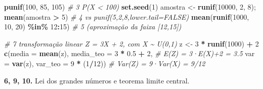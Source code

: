\documentclass[
  portuguese,
  11pt,
  openany]{book}
\newenvironment{Shaded}{\begin{snugshade}}{\end{snugshade}}
\newcommand{\AttributeTok}[1]{\textcolor[rgb]{0.13,0.29,0.53}{#1}}
\newcommand{\CommentTok}[1]{\textcolor[rgb]{0.56,0.35,0.01}{\textit{#1}}}
\newcommand{\DecValTok}[1]{\textcolor[rgb]{0.00,0.00,0.81}{#1}}
\newcommand{\FloatTok}[1]{\textcolor[rgb]{0.00,0.00,0.81}{#1}}
\newcommand{\FunctionTok}[1]{\textcolor[rgb]{0.13,0.29,0.53}{\textbf{#1}}}
\newcommand{\NormalTok}[1]{#1}
\newcommand{\OtherTok}[1]{\textcolor[rgb]{0.56,0.35,0.01}{#1}}
\newcommand{\SpecialCharTok}[1]{\textcolor[rgb]{0.81,0.36,0.00}{\textbf{#1}}}
\begin{document}
\begin{Shaded}
\begin{Highlighting}[]
\FunctionTok{punif}\NormalTok{(}\DecValTok{100}\NormalTok{, }\DecValTok{85}\NormalTok{, }\DecValTok{105}\NormalTok{)                              }\CommentTok{\# 3 P(X \textless{} 100)}
\FunctionTok{set.seed}\NormalTok{(}\DecValTok{1}\NormalTok{)}
\NormalTok{amostra }\OtherTok{\textless{}{-}} \FunctionTok{runif}\NormalTok{(}\DecValTok{10000}\NormalTok{, }\DecValTok{2}\NormalTok{, }\DecValTok{8}\NormalTok{); }\FunctionTok{mean}\NormalTok{(amostra }\SpecialCharTok{\textgreater{}} \DecValTok{5}\NormalTok{) }\CommentTok{\# 4 vs punif(5,2,8,lower.tail=FALSE)}
\FunctionTok{mean}\NormalTok{(}\FunctionTok{runif}\NormalTok{(}\DecValTok{1000}\NormalTok{, }\DecValTok{10}\NormalTok{, }\DecValTok{20}\NormalTok{) }\SpecialCharTok{\%in\%} \DecValTok{12}\SpecialCharTok{:}\DecValTok{15}\NormalTok{)             }\CommentTok{\# 5 (aproximação da faixa [12,15])}

\CommentTok{\# 7 transformação linear Z = 3X + 2, com X \textasciitilde{} U(0,1)}
\NormalTok{z }\OtherTok{\textless{}{-}} \DecValTok{3} \SpecialCharTok{*} \FunctionTok{runif}\NormalTok{(}\DecValTok{1000}\NormalTok{) }\SpecialCharTok{+} \DecValTok{2}
\FunctionTok{c}\NormalTok{(}\AttributeTok{media =} \FunctionTok{mean}\NormalTok{(z), }\AttributeTok{media\_teo =} \DecValTok{3} \SpecialCharTok{*} \FloatTok{0.5} \SpecialCharTok{+} \DecValTok{2}\NormalTok{,      }\CommentTok{\# E(Z) = 3·E(X)+2 = 3.5}
  \AttributeTok{var =} \FunctionTok{var}\NormalTok{(z),   }\AttributeTok{var\_teo =} \DecValTok{9} \SpecialCharTok{*}\NormalTok{ (}\DecValTok{1}\SpecialCharTok{/}\DecValTok{12}\NormalTok{))          }\CommentTok{\# Var(Z) = 9·Var(X) = 9/12}
\end{Highlighting}
\end{Shaded}

\textbf{6, 9, 10.} Lei dos grandes números e teorema limite central.
\end{document}
